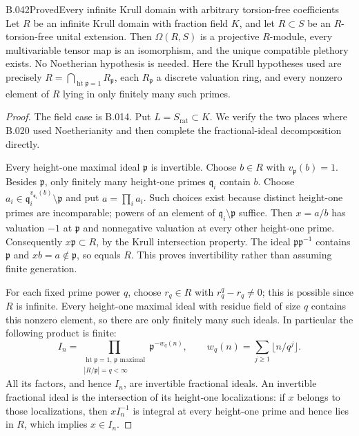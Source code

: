 \begin{saresult}{B.042}{Proved}{Every infinite Krull domain with arbitrary torsion-free coefficients}
Let $R$ be an infinite Krull domain with fraction field $K$, and
let $R\subset S$ be an $R$-torsion-free unital extension.
Then $\Omega(R,S)$ is a projective $R$-module, every
multivariable tensor map is an isomorphism, and the unique
compatible plethory exists. No Noetherian hypothesis is needed.
Here the Krull hypotheses used are precisely
$R=\bigcap_{\operatorname{ht}\mathfrak p=1}R_{\mathfrak p}$,
each $R_{\mathfrak p}$ a discrete valuation ring, and every
nonzero element of $R$ lying in only finitely many such primes.
\end{saresult}
\begin{proof}
The field case is B.014. Put $L=S_{\mathrm{rat}}\subset K$.
We verify the two places where B.020 used Noetherianity and
then complete the fractional-ideal decomposition directly.

Every height-one maximal ideal $\mathfrak p$ is invertible.
Choose $b\in R$ with $v_{\mathfrak p}(b)=1$. Besides
$\mathfrak p$, only finitely many height-one primes
$\mathfrak q_i$ contain $b$. Choose
$a_i\in\mathfrak q_i^{v_{\mathfrak q_i}(b)}\setminus\mathfrak p$
and put $a=\prod_i a_i$. Such choices exist because distinct
height-one primes are incomparable; powers of an element of
$\mathfrak q_i\setminus\mathfrak p$ suffice.
Then $x=a/b$ has valuation $-1$ at $\mathfrak p$ and
nonnegative valuation at every other height-one prime.
Consequently $x\mathfrak p\subset R$, by the Krull intersection
property. The ideal $\mathfrak p\mathfrak p^{-1}$ contains
$\mathfrak p$ and $xb=a\notin\mathfrak p$, so equals $R$.
This proves invertibility rather than assuming finite generation.

For each fixed prime power $q$, choose $r_q\in R$ with
$r_q^q-r_q\ne0$; this is possible since $R$ is infinite.
Every height-one maximal ideal with residue field of size $q$
contains this nonzero element, so there are only finitely many
such ideals. In particular the following product is finite:
\[
 I_n=\prod_{\substack{\operatorname{ht}\mathfrak p=1,\,
                       \mathfrak p\text{ maximal}\\
                       |R/\mathfrak p|=q<\infty}}
           \mathfrak p^{-w_q(n)},\qquad
 w_q(n)=\sum_{j\ge1}\lfloor n/q^j\rfloor.
\]
All its factors, and hence $I_n$, are invertible fractional ideals.
An invertible fractional ideal is the intersection of its
height-one localizations: if $x$ belongs to those localizations,
then $xI_n^{-1}$ is integral at every height-one prime and hence
lies in $R$, which implies $x\in I_n$.


\end{proof}
